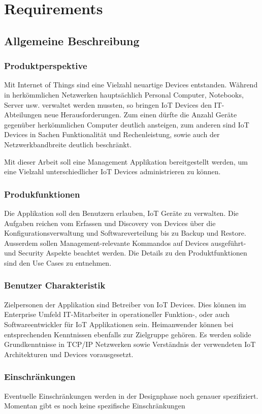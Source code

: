 \chapter{Requirements}
\section{Allgemeine Beschreibung}
\subsection{Produktperspektive}
Mit Internet of Things sind eine Vielzahl neuartige Devices entstanden. Während in herkömmlichen Netzwerken hauptsächlich Personal Computer, Notebooks, Server usw. verwaltet werden mussten, so bringen IoT Devices den IT-Abteilungen neue Herausforderungen. Zum einen dürfte die Anzahl Geräte gegenüber herkömmlichen Computer deutlich ansteigen, zum anderen sind IoT Devices in Sachen Funktionalität und Rechenleistung, sowie auch der Netzwerkbandbreite deutlich beschränkt. 

Mit dieser Arbeit soll eine Management Applikation bereitgestellt werden, um eine Vielzahl unterschiedlicher IoT Devices administrieren zu können. 
\subsection{Produkfunktionen}
Die Applikation soll den Benutzern erlauben, IoT Geräte zu verwalten. Die Aufgaben reichen vom Erfassen und Discovery von Devices über die Konfigurationsverwaltung und Softwareverteilung bis zu Backup und Restore. Ausserdem sollen Management-relevante Kommandos auf Devices ausgeführt- und Security Aspekte beachtet werden. Die Details zu den Produktfunktionen sind den Use Cases zu entnehmen.

\subsection{Benutzer Charakteristik}
Zielpersonen der Applikation sind Betreiber von IoT Devices. Dies können im Enterprise Umfeld IT-Mitarbeiter in operationeller Funktion-, oder auch Softwareentwickler für IoT Applikationen sein. Heimanwender können bei entsprechenden Kenntnissen ebenfalls zur Zielgruppe gehören. Es werden solide Grundkenntnisse in TCP/IP Netzwerken sowie Verständnis der verwendeten IoT Architekturen und Devices vorausgesetzt. 
\subsection{Einschränkungen}
Eventuelle Einschränkungen werden in der Designphase noch genauer spezifiziert. Momentan gibt es noch keine spezifische Einschränkungen
